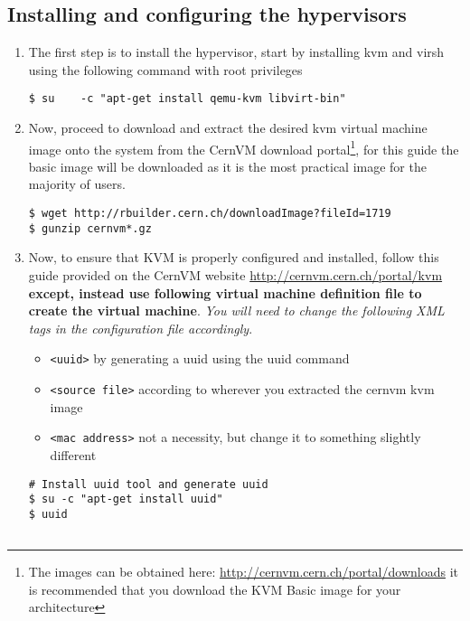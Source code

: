 \subsection{Installing and configuring the hypervisors}
\label{sec:debianhypervisor}
\begin{enumerate}
\item The first step is to install the hypervisor, start by installing kvm and virsh using the following command with root privileges

\lstset{language=bash,caption=Installing KVM and Virsh Support}
\begin{lstlisting}
$ su 	-c "apt-get install qemu-kvm libvirt-bin"
\end{lstlisting}

\item 	Now, proceed to download and extract the desired kvm virtual machine image onto the system from the CernVM download 		
		portal\footnote{The images can be obtained here: \url{http://cernvm.cern.ch/portal/downloads} it is recommended that you 
		download the KVM Basic image for your architecture}, for this guide the basic image will be downloaded as it is the most 
		practical image for the majority of users.

\lstset{language=bash,caption=Download and Extract CernVM KVM Basic Image}
\begin{lstlisting}
$ wget http://rbuilder.cern.ch/downloadImage?fileId=1719
$ gunzip cernvm*.gz
\end{lstlisting}

\item 	Now, to ensure that KVM is properly configured and installed, follow this guide provided on the CernVM website
		\url{http://cernvm.cern.ch/portal/kvm} {\bf except, instead use following virtual machine definition file to 
		create the virtual machine}. \emph{You will need to change the following XML tags in the configuration file accordingly}.
		
\begin{itemize}
\item \verb|<uuid>| by generating a uuid using the uuid command
\item \verb|<source file>| according to wherever you extracted the cernvm kvm image
\item \verb|<mac address>| not a necessity, but change it to something slightly different
\end{itemize}

\lstset{language=bash,caption=Create CernVM KVM Definition File}
\begin{lstlisting}
# Install uuid tool and generate uuid
$ su -c "apt-get install uuid"
$ uuid


\end{lstlisting}
\end{enumerate}
